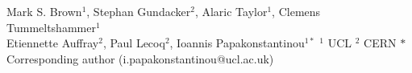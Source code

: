 Mark S. Brown${}^1$, Stephan Gundacker${}^2$, Alaric Taylor${}^1$, Clemens Tummeltshammer${}^1$\\ 
Etiennette Auffray${}^2$, Paul Lecoq${}^2$, Ioannis Papakonstantinou${}^{1*}$
${}^1$ UCL
${}^2$ CERN
$*$ Corresponding author (i.papakonstantinou@ucl.ac.uk)
